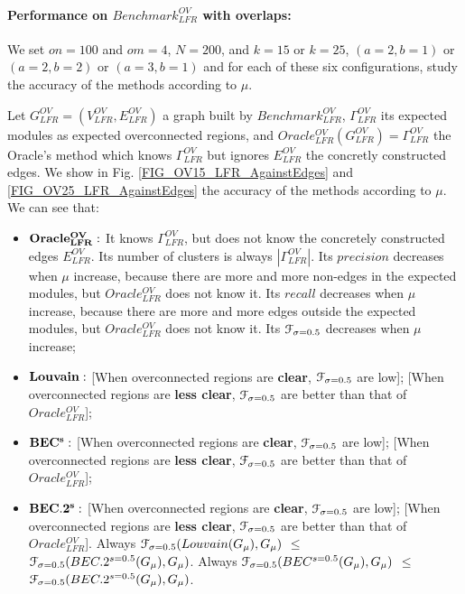 \documentclass[12pt]{article}
\theoremstyle{thmstyleone}%
\theoremstyle{definition}
\begin{document}
\color{black}
\paragraph{Performance on $Benchmark^{OV}_{LFR}$ with overlaps: \label{PerfBenchLFRWit}}

We set $on=100$ and $om=4$, $N=200$, and $k=15$ or $k=25$, $(a=2, b=1)$ or $(a=2, b=2)$ or $(a=3, b=1)$
and for each of these six configurations, study the accuracy of the methods according to $\mu$.

\vspace{0.20cm}
\noindent
Let $G^{OV}_{LFR}=(V^{OV}_{LFR},E^{OV}_{LFR})$ a graph built by $Benchmark^{OV}_{LFR}$,
$\Gamma^{OV}_{LFR}$ its expected modules as expected overconnected regions,
and $Oracle^{OV}_{LFR}(G^{OV}_{LFR})=\Gamma^{OV}_{LFR}$ the Oracle's method which knows $\Gamma^{OV}_{LFR}$ but ignores $E^{OV}_{LFR}$ the concretly constructed edges.
%
We show in Fig. \ref{FIG_OV15_LFR_AgainstEdges} and \ref{FIG_OV25_LFR_AgainstEdges} the accuracy of the methods according to $\mu$.
We can see that:

\color{black}
\begin{itemize}

    \item $\bf Oracle^{OV}_{LFR}:$ It knows $\Gamma^{OV}_{LFR}$, but does not know the concretely constructed edges $E^{OV}_{LFR}$.
    Its number of clusters is always $|\Gamma^{OV}_{LFR}|$.
    Its $precision$ decreases when $\mu$ increase, because there are more and more non-edges in the expected modules, but $Oracle^{OV}_{LFR}$ does not know it.
    Its $recall$ decreases when $\mu$ increase, because there are more and more edges outside the expected modules, but $Oracle^{OV}_{LFR}$ does not know it.
    Its $\EuScript{F}_{\sigma=0.5}$ decreases when $\mu$ increase;

    \item $\bf Louvain:$ [When overconnected regions are {\bf clear}, $\EuScript{F}_{\sigma=0.5}$ are low]; [When overconnected regions are {\bf less clear}, $\EuScript{F}_{\sigma=0.5}$ are better than that of $Oracle^{OV}_{LFR}$];

    \item $\bf BEC^{s}:$ [When overconnected regions are {\bf clear}, $\EuScript{F}_{\sigma=0.5}$ are low]; [When overconnected regions are {\bf less clear}, $\EuScript{F}_{\sigma=0.5}$ are better than that of $Oracle^{OV}_{LFR}$];

    \item $\bf BEC.2^{s}:$ [When overconnected regions are {\bf clear}, $\EuScript{F}_{\sigma=0.5}$ are low]; [When overconnected regions are {\bf less clear}, $\EuScript{F}_{\sigma=0.5}$ are better than that of $Oracle^{OV}_{LFR}$].
    Always $\EuScript{F}_{\sigma=0.5}(Louvain(G_{\mu}), G_{\mu})$ $\leqslant$ $\EuScript{F}_{\sigma=0.5}(BEC.2^{s=0.5}(G_{\mu}), G_{\mu})$.
    Always $\EuScript{F}_{\sigma=0.5}(BEC^{s=0.5}(G_{\mu}), G_{\mu})$ $\leqslant$ $\EuScript{F}_{\sigma=0.5}(BEC.2^{s=0.5}(G_{\mu}), G_{\mu})$.
\end{itemize}
\end{document}
